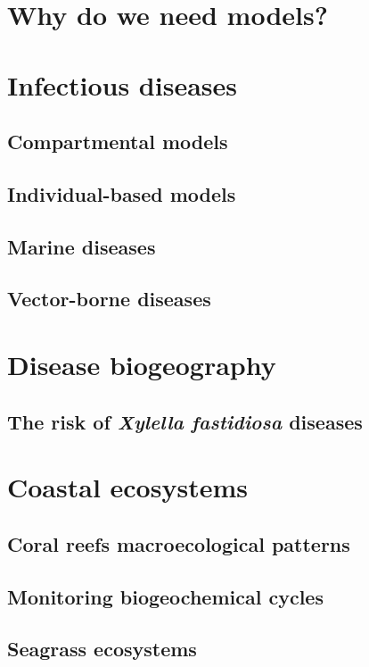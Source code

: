 \section{\label{sec:Why do we need models?} Why do we need models?}

\section{\label{sec:Infectious diseases} Infectious
  diseases}

\subsection{\label{sec:Compartmental models} Compartmental models}

\subsection{\label{sec:Individual-based models} Individual-based models}

\subsection{\label{sec:Marine diseases} Marine diseases}

\subsection{\label{sec:Vector-borne diseases} Vector-borne diseases}

\section{\label{sec:Disease biogeography} Disease biogeography}

\subsection{\label{sec:The risk of Xylella fastidiosa diseases} The risk of
  \textit{Xylella fastidiosa} diseases}

\section{\label{sec:Data-driven modelling for coastal ecosystems} Coastal
  ecosystems}

\subsection{\label{sec:Coral reefs macroecological patterns} Coral reefs
  macroecological patterns}

\subsection{\label{sec:Monitoring biogeochemical cycles} Monitoring
  biogeochemical cycles}

\subsection{\label{sec:Seagrass ecosystems} Seagrass ecosystems}